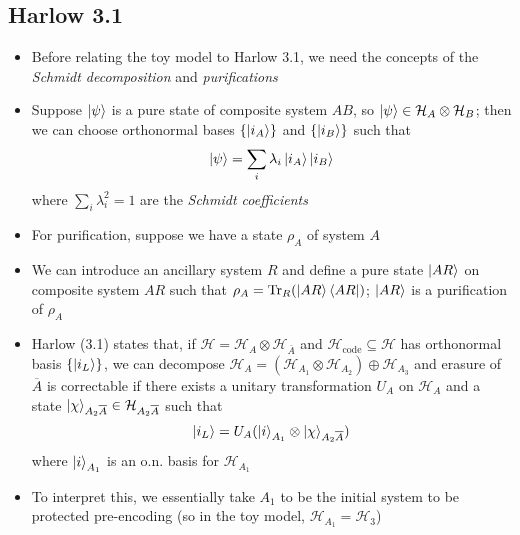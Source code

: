 \documentclass[12pt,a4paper]{article}
\numberwithin{equation}{section}
\newcommand{\ketbra}[2]{\ket{#1}\bra{#2}}
\newcommand{\ketbras}[1]{\ketbra{#1}{#1}}
\begin{document}
	\subsection{Harlow 3.1}
	\begin{itemize}
		\item Before relating the toy model to Harlow 3.1, we need the concepts of the \textit{Schmidt decomposition} and \textit{purifications}
		\item Suppose $\ket{\psi}$ is a pure state of composite system $AB$, so $\ket{\psi}\in\mathcal{H}_{A}\otimes\mathcal{H}_{B}$; then we can choose orthonormal bases $\{\ket{i_{A}}\}$ and $\{\ket{i_{B}}\}$ such that
		\begin{equation}
			\ket{\psi}=\sum_{i}\lambda_{i}\ket{i_{A}}\ket{i_{B}}
		\end{equation}
		where $\sum_{i}\lambda_{i}^{2}=1$ are the \textit{Schmidt coefficients}
		\item For purification, suppose we have a state $\rho_{A}$ of system $A$
		\item We can introduce an ancillary system $R$ and define a pure state $\ket{AR}$ on composite system $AR$ such that $\rho_{A}=\text{Tr}_{R}(\ketbras{AR})$; $\ket{AR}$ is a purification of $\rho_{A}$
		\item Harlow (3.1) states that, if $\mathcal{H}=\mathcal{H}_{A}\otimes\mathcal{H}_{\overline{A}}$ and $\mathcal{H}_{\text{code}}\subseteq\mathcal{H}$ has orthonormal basis $\{\ket{i_{L}}\}$, we can decompose $\mathcal{H}_{A}=(\mathcal{H}_{A_{1}}\otimes\mathcal{H}_{A_{2}})\oplus\mathcal{H}_{A_{3}}$ and erasure of $\overline{A}$ is correctable if there exists a unitary transformation $U_{A}$ on $\mathcal{H}_A$ and a state $\ket{\chi}_{A_{2}\overline{A}}\in\mathcal{H}_{A_{2}\overline{A}}$ such that
		\begin{equation}
			\ket{i_{L}}=U_{A}(\ket{i}_{A_{1}}\otimes\ket{\chi}_{A_{2}\overline{A}})
		\end{equation}
		where $\ket{i}_{A_{1}}$ is an o.n. basis for $\mathcal{H}_{A_{1}}$
		\item To interpret this, we essentially take $A_{1}$ to be the initial system to be protected pre-encoding (so in the toy model, $\mathcal{H}_{A_{1}}=\mathcal{H}_{3}$)
	\end{itemize}
\end{document}
